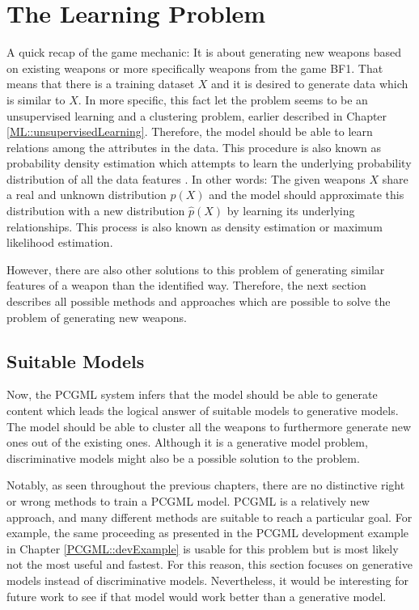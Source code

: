\documentclass[MGS,Master,english]{twbook}%
\begin{document}
\section{The Learning Problem}
A quick recap of the game mechanic: It is about generating new weapons based on existing weapons or more specifically weapons from the game \ac{BF1}. That means that there is a training dataset $X$ and it is desired to generate data which is similar to $X$. In more specific, this fact let the problem seems to be an unsupervised learning and a clustering problem, earlier described in Chapter \ref{ML::unsupervisedLearning}. Therefore, the model should be able to learn relations among the attributes in the data. This procedure is also known as probability density estimation which attempts to learn the underlying probability distribution of all the data features \cite{ml::vae::tutorial}. In other words: The given weapons $X$ share a real and unknown distribution $p(X)$ and the model should approximate this distribution with a new distribution $\hat{p}(X)$ by learning its underlying relationships. This process is also known as density estimation or maximum likelihood estimation. 

However, there are also other solutions to this problem of generating similar features of a weapon than the identified way. Therefore, the next section describes all possible methods and approaches which are possible to solve the problem of generating new weapons.

\subsection{Suitable Models}
Now, the \ac{PCGML} system infers that the model should be able to generate content which leads the logical answer of suitable models to generative models. The model should be able to cluster all the weapons to furthermore generate new ones out of the existing ones. Although it is a generative model problem, discriminative models might also be a possible solution to the problem.

Notably, as seen throughout the previous chapters, there are no distinctive right or wrong methods to train a \ac{PCGML} model. \ac{PCGML} is a relatively new approach, and many different methods are suitable to reach a particular goal. For example, the same proceeding as presented in the \ac{PCGML} development example in Chapter \ref{PCGML::devExample} is usable for this problem but is most likely not the most useful and fastest. For this reason, this section focuses on generative models instead of discriminative models. Nevertheless, it would be interesting for future work to see if that model would work better than a generative model. 
\end{document}
